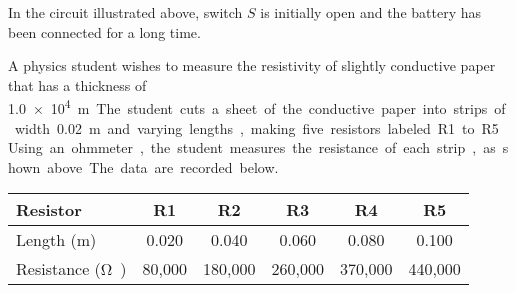 \documentclass{../../oss-classkick-exam}
\begin{document}
\begin{questions}
  \question In the circuit illustrated above, switch $S$ is initially open and
  the battery has been connected for a long time.
  \newpage

  
  \question A physics student wishes to measure the resistivity of slightly
  conductive paper that has a thickness of \SI{1.0e4}\metre. The student cuts
  a sheet of the conductive paper into strips of width \SI{.02}{\metre} and
  varying lengths, making five resistors labeled R1 to R5. Using an ohmmeter,
  the student measures the resistance of each strip, as shown above. The data
  are recorded below.
  \begin{center}
    \begin{tabular}{|l|c|c|c|c|c|}
      \hline
      Resistor & R1 & R2 & R3 & R4 & R5 \\ \hline
      Length (m) & 0.020 & 0.040 & 0.060 & 0.080 & 0.100\\ \hline
      Resistance (\si\ohm) & 80,000 & 180,000 & 260,000 & 370,000 & 440,000\\
      \hline
    \end{tabular}
  \end{center}
  \begin{parts}

\end{parts}
\end{questions}
\end{document}
